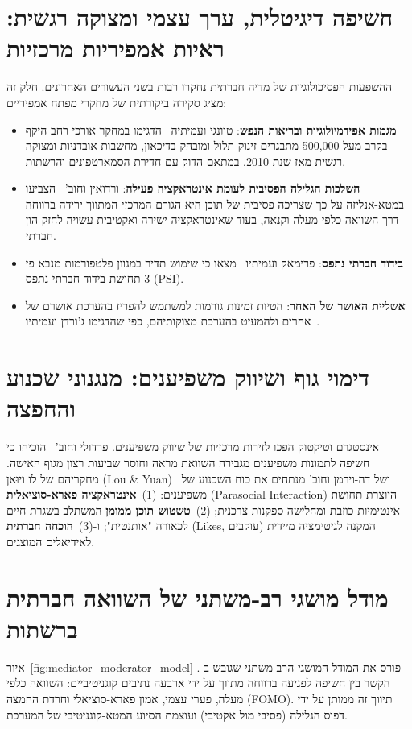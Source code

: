 \section{חשיפה דיגיטלית, ערך עצמי ומצוקה רגשית: ראיות אמפיריות מרכזיות}
\label{sec:lit_empirical_evidence}
ההשפעות הפסיכולוגיות של מדיה חברתית נחקרו רבות בשני העשורים האחרונים. חלק זה מציג סקירה ביקורתית של מחקרי מפתח אמפיריים:
\begin{itemize}
    \item \textbf{מגמות אפידמיולוגיות ובריאות הנפש}: טוונגי ועמיתיה~\cite{twenge2018increases} הדגימו במחקר אורכי רחב היקף בקרב מעל 500,000 מתבגרים זינוק תלול ומובהק בדיכאון, מחשבות אובדניות ומצוקה רגשית מאז שנת 2010, במתאם הדוק עם חדירת הסמארטפונים והרשתות.
    \item \textbf{השלכות הגלילה הפסיבית לעומת אינטראקציה פעילה}: ורדואין וחוב'~\cite{verduyn2017social} הצביעו במטא-אנליזה על כך שצריכה פסיבית של תוכן היא הגורם המרכזי המתווך ירידה ברווחה דרך השוואה כלפי מעלה וקנאה, בעוד שאינטראקציה ישירה ואקטיבית עשויה לחזק הון חברתי.
    \item \textbf{בידוד חברתי נתפס}: פרימאק ועמיתיו~\cite{primack2017social} מצאו כי שימוש תדיר במגוון פלטפורמות מנבא פי 3 תחושת בידוד חברתי נתפס (\textenglish{PSI}).
    \item \textbf{אשליית האושר של האחר}: הטיות זמינות גורמות למשתמש להפריז בהערכת אושרם של אחרים ולהמעיט בהערכת מצוקותיהם, כפי שהדגימו ג'ורדן ועמיתיו~\cite{jordan2011misery}.
\end{itemize}

\section{דימוי גוף ושיווק משפיענים: מנגנוני שכנוע והחפצה}
\label{sec:lit_body_image_influencers}
אינסטגרם וטיקטוק הפכו לזירות מרכזיות של שיווק משפיענים. פרדולי וחוב'~\cite{fardouly2018instagram} הוכיחו כי חשיפה לתמונות משפיענים מגבירה השוואת מראה וחוסר שביעות רצון מגוף האישה. מחקריהם של לו ויוּאן (\textenglish{Lou \& Yuan})~\cite{lou2019influencer} ושל דה-וירמן וחוב' מנתחים את כוח השכנוע של משפיענים: (1)~\textbf{אינטראקציה פארא-סוציאלית} (\textenglish{Parasocial Interaction}) היוצרת תחושת אינטימיות כוזבת ומחלישה ספקנות צרכנית; (2)~\textbf{טשטוש תוכן ממומן} המשתלב בשגרת חיים לכאורה "אותנטית"; ו-(3)~\textbf{הוכחה חברתית} (\textenglish{Likes}, עוקבים) המקנה לגיטימציה מיידית לאידיאלים המוצגים.

\section{מודל מושגי רב-משתני של השוואה חברתית ברשתות}
\label{sec:lit_mediators_moderators}
איור~\ref{fig:mediator_moderator_model} פורס את המודל המושגי הרב-משתני שגובש ב-\projectname{}. הקשר בין חשיפה לפגיעה ברווחה מתווך על ידי ארבעה נתיבים קוגניטיביים: השוואה כלפי מעלה, פערי עצמי, אמון פארא-סוציאלי וחרדת החמצה (\textenglish{FOMO}). תיווך זה ממותן על ידי דפוס הגלילה (פסיבי מול אקטיבי) ועוצמת הסיוע המטא-קוגניטיבי של המערכת.

